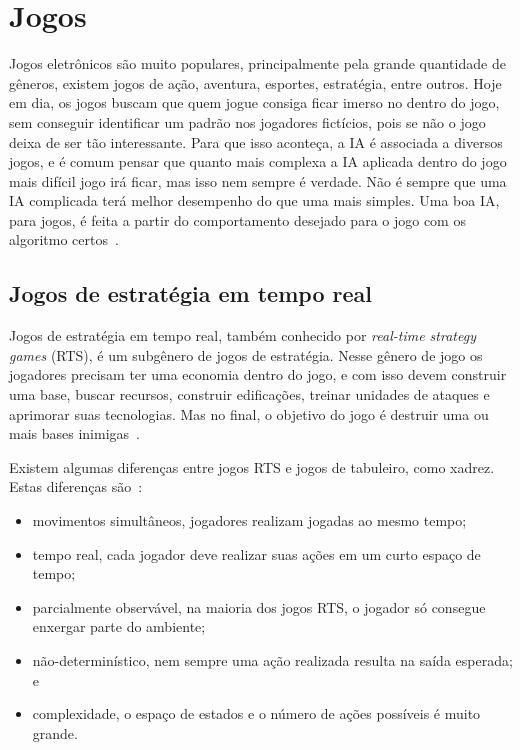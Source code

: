 \chapter{\label{chap:ativ}Jogos}

Jogos eletrônicos são muito populares, principalmente pela grande quantidade de gêneros, existem jogos de ação, aventura, esportes, estratégia, entre outros. Hoje em dia, os jogos buscam que quem jogue consiga ficar imerso no dentro do jogo, sem conseguir identificar um padrão nos jogadores fictícios, pois se não o jogo deixa de ser tão interessante. Para que isso aconteça, a IA é associada a diversos jogos, e é comum pensar que quanto mais complexa a IA aplicada dentro do jogo mais difícil jogo irá ficar, mas isso nem sempre é verdade. Não é sempre que uma IA complicada terá melhor desempenho do que uma mais simples. Uma boa IA, para jogos, é feita a partir do comportamento desejado para o jogo com os algoritmo certos~\cite{millington2009artificial}.

\section{Jogos de estratégia em tempo real}

Jogos de estratégia em tempo real, também conhecido por \textit{real-time strategy games} (RTS), é um subgênero de jogos de estratégia. Nesse gênero de jogo os jogadores precisam ter uma economia dentro do jogo, e com isso devem construir uma base, buscar recursos, construir edificações, treinar unidades de ataques e aprimorar suas tecnologias. Mas no final, o objetivo do jogo é destruir uma ou mais bases inimigas~\cite{ontanon2013survey, buro2012real}. 

Existem algumas diferenças entre jogos RTS e jogos de tabuleiro, como xadrez. Estas diferenças são~\cite{ontanon2013survey}:

\begin{itemize}
	\item movimentos simultâneos, jogadores realizam jogadas ao mesmo tempo;
	\item tempo real, cada jogador deve realizar suas ações em um curto espaço de tempo;
	\item parcialmente observável, na maioria dos jogos RTS, o jogador só consegue enxergar parte do ambiente;
	\item não-determinístico, nem sempre uma ação realizada resulta na saída esperada; e
	\item complexidade, o espaço de estados e o número de ações possíveis é muito grande.
\end{itemize} 

